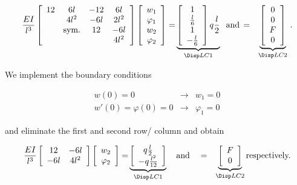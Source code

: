 \begin{eqnarray}
\dfrac{EI}{l^3}
\left[ 
\begin{array}{cccc}
12 & 6l          & -12 &   6l \\
   & 4l^2        & -6l & 2l^2 \\
   & \mbox{sym.} &  12 &  -6l \\
   &             &     & 4l^2 \\
\end{array} 
\right]
\left[ 
\begin{array}{c}
w_1 \\ \varphi_1 \\ w_2 \\ \varphi_2
\end{array} 
\right] = &
\underbrace{
\left[ 
\begin{array}{c}
1 \\ \frac{l}{6} \\ 1 \\ - \frac{l}{6}
\end{array} 
\right] q \dfrac{l}{2}}_{\Disp LC1}  
\;\; \mbox{and} \, =& 
\underbrace{
\left[ 
\begin{array}{c}
0 \\ 0 \\ F \\ 0
\end{array} 
\right]}_{\Disp LC2} \, . 
\end{eqnarray}

We implement the boundary conditions 

\begin{eqnarray}
w(0) = 0 & \rightarrow & w_1 = 0 \\
w'(0) = \varphi(0) = 0 & \rightarrow & \varphi_1 = 0
\end{eqnarray}

and eliminate the first and second row/ column and 
obtain 

\begin{eqnarray}
\dfrac{EI}{l^3} \left[ \begin{array}{cc}
12 & -6l \\ -6l & 4l^2 \end{array} \right]
\left[ \begin{array}{c} w_2 \\ \varphi_2 \end{array} \right] = & 
\underbrace{
\left[ \begin{array}{c} q \frac{l}{2} \\ -q \frac{l^2}{12} \end{array}
\right]}_{\Disp LC1}
\quad \mbox{and} \quad =& 
\underbrace{
\left[ \begin{array}{c} F \\ 0 \end{array} \right]
}_{\Disp LC2} \mbox{respectively.} 
\end{eqnarray}

